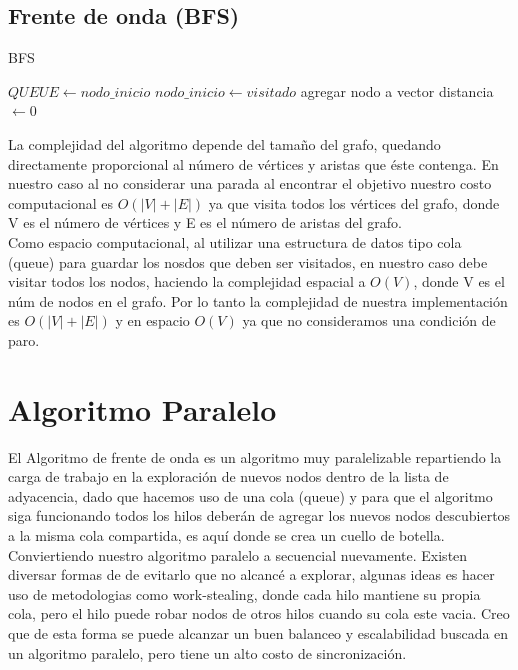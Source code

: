\documentclass[oneside,twocolumn]{article}
\begin{document}
\subsection{Frente de onda (BFS)}


\begin{algorithm}
\caption{BFS}\label{alg:two}
$QUEUE \gets nodo\_inicio$ 
$nodo\_inicio \gets visitado$ 
agregar nodo a vector distancia $\gets 0$

\end{algorithm}

La complejidad del algoritmo depende del tamaño del grafo, quedando directamente proporcional al número de vértices y aristas que éste contenga. En nuestro caso al no considerar una parada al encontrar el objetivo nuestro costo computacional es $O(|V|+|E|)$ ya que visita todos los vértices del grafo, donde V es el número de vértices y E es el número de aristas del grafo.\\

Como espacio computacional, al utilizar una estructura de datos tipo cola (queue) para guardar los nosdos que deben ser visitados, en nuestro caso debe visitar todos los nodos, haciendo la complejidad espacial a $O(V)$, donde V es el núm de nodos en el grafo. Por lo tanto la complejidad de nuestra implementación es $O(|V|+|E|)$ y en espacio $O(V)$ ya que no consideramos una condición de paro.

\newpage
\onecolumn
\section{Algoritmo Paralelo}

El Algoritmo de frente de onda es un algoritmo muy paralelizable repartiendo la carga de trabajo en la exploración de nuevos nodos dentro de la lista de adyacencia, dado que hacemos uso de una cola (queue) y para que el algoritmo siga funcionando todos los hilos deberán de agregar los nuevos nodos descubiertos a la misma cola compartida, es aquí donde se crea un cuello de botella. Conviertiendo nuestro algoritmo paralelo a secuencial nuevamente. Existen diversar formas de de evitarlo que no alcancé a explorar, algunas ideas es hacer uso de metodologias como work-stealing, donde cada hilo mantiene su propia cola, pero el hilo puede robar nodos de otros hilos cuando su cola este vacia. Creo que de esta forma se puede alcanzar un buen balanceo y escalabilidad buscada en un algoritmo paralelo, pero tiene un alto costo de sincronización.\\
\end{document}
